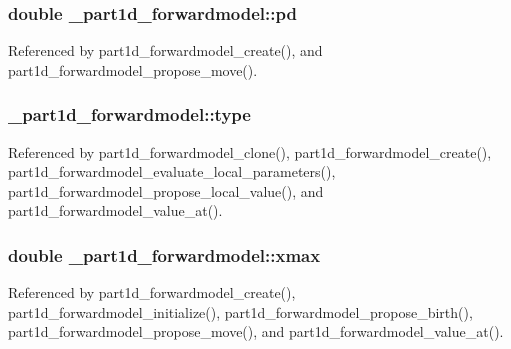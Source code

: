 \subsubsection[{\texorpdfstring{pd}{pd}}]{\setlength{\rightskip}{0pt plus 5cm}double \+\_\+part1d\+\_\+forwardmodel\+::pd}\hypertarget{struct__part1d__forwardmodel_a0071470483f0ca89c0e7c33f8d1f7ca7}{}\label{struct__part1d__forwardmodel_a0071470483f0ca89c0e7c33f8d1f7ca7}


Referenced by part1d\+\_\+forwardmodel\+\_\+create(), and part1d\+\_\+forwardmodel\+\_\+propose\+\_\+move().

\subsubsection[{\texorpdfstring{type}{type}}]{ \+\_\+part1d\+\_\+forwardmodel\+::type}\hypertarget{struct__part1d__forwardmodel_a1131d1d6210a71cae3bad507cf87dfd7}{}\label{struct__part1d__forwardmodel_a1131d1d6210a71cae3bad507cf87dfd7}


Referenced by part1d\+\_\+forwardmodel\+\_\+clone(), part1d\+\_\+forwardmodel\+\_\+create(), part1d\+\_\+forwardmodel\+\_\+evaluate\+\_\+local\+\_\+parameters(), part1d\+\_\+forwardmodel\+\_\+propose\+\_\+local\+\_\+value(), and part1d\+\_\+forwardmodel\+\_\+value\+\_\+at().

\subsubsection[{\texorpdfstring{xmax}{xmax}}]{\setlength{\rightskip}{0pt plus 5cm}double \+\_\+part1d\+\_\+forwardmodel\+::xmax}\hypertarget{struct__part1d__forwardmodel_a559c425f5d734f5fcdfc27bcd51c7a87}{}\label{struct__part1d__forwardmodel_a559c425f5d734f5fcdfc27bcd51c7a87}


Referenced by part1d\+\_\+forwardmodel\+\_\+create(), part1d\+\_\+forwardmodel\+\_\+initialize(), part1d\+\_\+forwardmodel\+\_\+propose\+\_\+birth(), part1d\+\_\+forwardmodel\+\_\+propose\+\_\+move(), and part1d\+\_\+forwardmodel\+\_\+value\+\_\+at().

